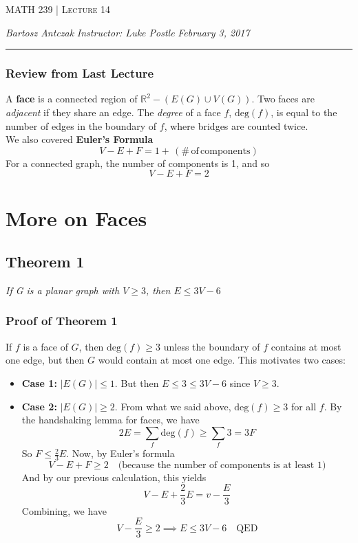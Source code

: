 \documentclass{report}
\newcommand{\lectureNum}{14}
\newcommand{\curDate}{February 3, 2017}
\newcommand{\course}{MATH 239}
\newcommand{\instructor}{Luke Postle}
\begin{document}
\begin{center}
\begin{Large}
\textsc{\course{} | Lecture \lectureNum{}}
\end{Large}
\end{center} 
\noindent \textit{Bartosz Antczak} \hfill
\textit{Instructor: \instructor{}} \hfill
\textit{\curDate{}}
\rule{\textwidth}{0.4pt}

\subsubsection{Review from Last Lecture}
A \textbf{face} is a connected region of $\mathbb{R}^2 - (E(G) \cup V(G))$. Two faces are \textit{adjacent} if they share an edge. The \textit{degree} of a face $f$, $\mathrm{deg} (f)$, is equal to the number of edges in the boundary of $f$, where bridges are counted twice.\\
We also covered \textbf{Euler's Formula}
$$V - E + F = 1 + \,(\mathrm{\# \, of \, components})$$
For a connected graph, the number of components is 1, and so
$$V - E + F = 2$$
\section{More on Faces}
\subsection{Theorem 1}
\begin{center}
\textit{If G is a planar graph with $V \geq 3$, then $E \leq 3V - 6$}
\end{center}
\subsubsection{Proof of Theorem 1}
If $f$ is a face of $G$, then $\mathrm{deg}(f) \geq 3$ unless the boundary of $f$ contains at most one edge, but then $G$ would contain at most one edge. This motivates two cases:
\begin{itemize}
\item \textbf{Case 1:} $\vert E(G)\vert \leq 1$. But then $E \leq 3 \leq 3V - 6$ since $V \geq 3$.
\item \textbf{Case 2:} $\vert E(G) \vert \geq 2$. From what we said above, $\mathrm{deg}(f) \geq 3$ for all $f$. By the handshaking lemma for faces, we have $$2E = \sum_f \mathrm{deg}(f) \geq \sum_f 3 = 3F$$ So $F \leq \frac{2}{3}E$. Now, by Euler's formula
$$V - E + F \geq 2 \quad \text{(because the number of components is at least 1)} $$
And by our previous calculation, this yields
$$V - E + \frac{2}{3}E = v - \frac{E}{3}$$
Combining, we have
$$V - \frac{E}{3} \geq 2 \implies E \leq 3V - 6 \quad \text{QED}$$ 
\end{itemize}
\end{document}
